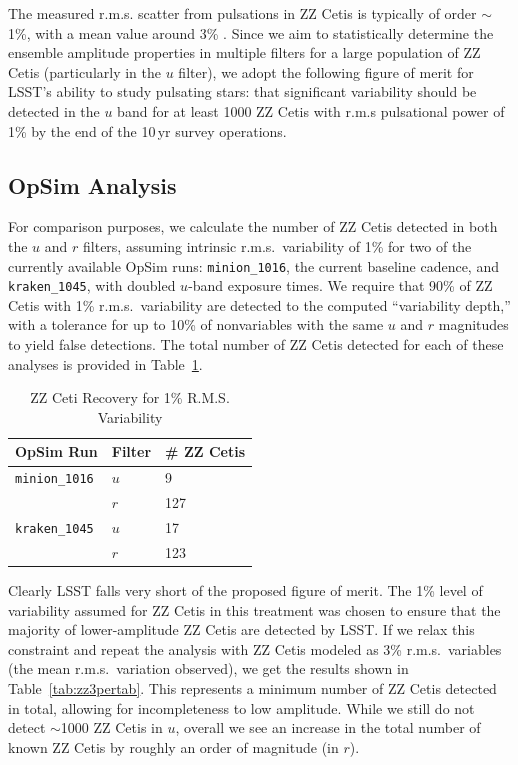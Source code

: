 The measured r.m.s. scatter from pulsations in ZZ Cetis is typically of order $\sim$1\%, with a mean value around 3\% \citep{2006ApJ...640..956M}.  Since we aim to statistically determine the ensemble amplitude properties in multiple filters for a large population of ZZ Cetis (particularly in the $u$ filter), we adopt the following figure of merit for LSST's ability to study pulsating stars: that significant variability should be detected in the $u$ band for at least 1000 ZZ Cetis with r.m.s pulsational power of 1\% by the end of the 10\,yr survey operations.



\subsection{OpSim Analysis}
\label{sec:\secname:analysis}

For comparison purposes, we calculate the number of ZZ Cetis detected in both the $u$ and $r$ filters, assuming intrinsic r.m.s.\ variability of 1\% for two of the currently available OpSim runs: {\tt minion\_1016}, the current baseline cadence, and {\tt kraken\_1045}, with doubled $u$-band exposure times. We require that 90\% of ZZ Cetis with 1\% r.m.s.\  variability are detected to the computed ``variability depth,'' with a tolerance for up to 10\% of nonvariables with the same $u$ and $r$ magnitudes to yield false detections.  The total number of ZZ Cetis detected for each of these analyses is provided in Table~\ref{tab:zz1pertab}.


\begin{table}[h]
\begin{center}
    \caption{ZZ Ceti Recovery for 1\% R.M.S. Variability}\label{tab:zz1pertab}
    \begin{tabular}{| l | l | l |}
    \hline
    OpSim Run & Filter & \# ZZ Cetis \\ \hline
     {\tt minion\_1016} & $u$ & 9  \\ 
      & $r$ & 127 \\ \hline
    {\tt kraken\_1045}  & $u$ & 17\\
    & $r$ & 123  \\ \hline
    \end{tabular}
\end{center}
\end{table}

Clearly LSST falls very short of the proposed figure of merit.  The 1\% level of variability assumed for ZZ Cetis in this treatment was chosen to ensure that the majority of lower-amplitude ZZ Cetis are detected by LSST.  If we relax this constraint and repeat the analysis with ZZ Cetis modeled as 3\% r.m.s.\ variables (the mean r.m.s.\ variation observed), we get the results shown in Table~\ref{tab:zz3pertab}.  This represents a minimum number of ZZ Cetis detected in total, allowing for incompleteness to low amplitude.  While we still do not detect $\sim$1000 ZZ Cetis in $u$, overall we see an increase in the total number of known ZZ Cetis by roughly an order of magnitude (in $r$).


